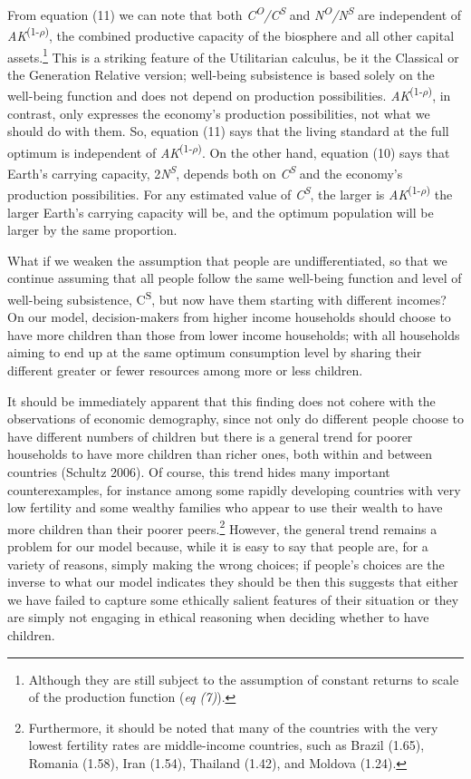 \documentclass[man,11pt,a4paper,floatsintext]{apa7}
\begin{document}
From equation (11) we can note that both \textit{C}\textsuperscript{\textit{O}}\textit{/C}\textsuperscript{\textit{S}} and \textit{N}\textsuperscript{\textit{O}}\textit{/N}\textsuperscript{\textit{S}} are independent of \textit{AK}\textsuperscript{(1-$\rho$)}, the combined productive capacity of the biosphere and all other capital assets.\footnote{Although they are still subject to the assumption of constant returns to scale of the production function (\textit{eq (7)}).} This is a striking feature of the Utilitarian calculus, be it the Classical or the Generation Relative version; well-being subsistence is based solely on the well-being function and does not depend on production possibilities. \textit{AK}\textsuperscript{(1-$\rho$)}, in contrast, only expresses the economy's production possibilities, not what we should do with them. So, equation (11) says that the living standard at the full optimum is independent of \textit{AK}\textsuperscript{(1-$\rho$)}. On the other hand, equation (10) says that Earth's carrying capacity, 2\textit{N}\textsuperscript{\textit{S}}, depends both on \textit{C}\textsuperscript{\textit{S}} and the economy's production possibilities. For any estimated value of \textit{C}\textsuperscript{\textit{S}}, the larger is \textit{AK}\textsuperscript{(1-$\rho$)} the larger Earth's carrying capacity will be, and the optimum population will be larger by the same proportion.

What if we weaken the assumption that people are undifferentiated, so that we continue assuming that all people follow the same well-being function and level of well-being subsistence, C\textsuperscript{S}, but now have them starting with different incomes? On our model, decision-makers from higher income households should choose to have more children than those from lower income households; with all households aiming to end up at the same optimum consumption level by sharing their different greater or fewer resources among more or less children.

It should be immediately apparent that this finding does not cohere with the observations of economic demography, since not only do different people choose to have different numbers of children but there is a general trend for poorer households to have more children than richer ones, both within and between countries (Schultz 2006). Of course, this trend hides many important counterexamples, for instance among some rapidly developing countries with very low fertility and some wealthy families who appear to use their wealth to have more children than their poorer peers.\footnote{Furthermore, it should be noted that many of the countries with the very lowest fertility rates are middle-income countries, such as Brazil (1.65), Romania (1.58), Iran (1.54), Thailand (1.42), and Moldova (1.24).} However, the general trend remains a problem for our model because, while it is easy to say that people are, for a variety of reasons, simply making the wrong choices; if people's choices are the inverse to what our model indicates they should be then this suggests that either we have failed to capture some ethically salient features of their situation or they are simply not engaging in ethical reasoning when deciding whether to have children.
\end{document}
